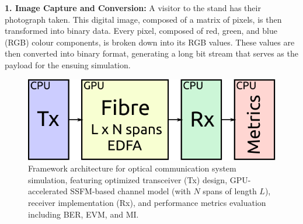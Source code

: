 \textbf{1. Image Capture and Conversion:} A visitor to the stand has their photograph taken. This digital image, composed of a matrix of pixels, is then transformed into binary data. Every pixel, composed of red, green, and blue (RGB) colour components, is broken down into its RGB values. These values are then converted into binary format, generating a long bit stream that serves as the payload for the ensuing simulation.


\begin{figure}[t]
   \centering
        \includegraphics[width=0.7\linewidth]{images/hpcom/hpcom_scheme.pdf}
    \caption{Framework architecture for optical communication system simulation, featuring optimized transceiver (Tx) design, GPU-accelerated SSFM-based channel model (with $N$ spans of length $L$), receiver implementation (Rx), and performance metrics evaluation including BER, EVM, and MI.}
    \label{fig:HpCom_scheme}
\end{figure}

